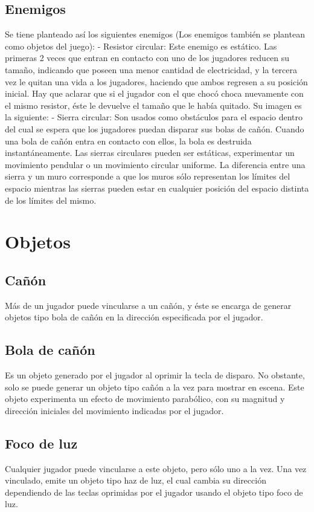 \documentclass{article}
\begin{document}
\subsection{Enemigos}
Se tiene planteado así los siguientes enemigos (Los enemigos también se plantean como objetos del juego):
    - Resistor circular: Este enemigo es estático. Las primeras 2 veces que entran en contacto con uno de los jugadores reducen su tamaño, indicando que poseen una menor cantidad de electricidad, y la tercera vez le quitan una vida a los jugadores, haciendo que ambos regresen a su posición inicial. Hay que aclarar que si el jugador con el que chocó choca nuevamente con el mismo resistor, éste le devuelve el tamaño que le había quitado. Su imagen es la siguiente:
    - Sierra circular: Son usados como obstáculos para el espacio dentro del cual se espera que los jugadores puedan disparar sus bolas de cañón. Cuando una bola de cañón entra en contacto con ellos, la bola es destruida instantáneamente. Las sierras circulares pueden ser estáticas, experimentar un movimiento pendular o un movimiento circular uniforme. La diferencia entre una sierra y un muro corresponde a que los muros sólo representan los límites del espacio mientras las sierras pueden estar en cualquier posición del espacio distinta de los límites del mismo.
\section{Objetos}
\subsection{Cañón}
Más de un jugador puede vincularse a un cañón, y éste se encarga de generar objetos tipo bola de cañón en la dirección especificada por el jugador.
\subsection{Bola de cañón}
Es un objeto generado por el jugador al oprimir la tecla de disparo. No obstante, solo se puede generar un objeto tipo cañón a la vez para mostrar en escena. Este objeto experimenta un efecto de movimiento parabólico, con su magnitud y dirección iniciales del movimiento indicadas por el jugador.
\subsection{Foco de luz}
Cualquier jugador puede vincularse a este objeto, pero sólo uno a la vez. Una vez vinculado, emite un objeto tipo haz de luz, el cual cambia su dirección dependiendo de las teclas oprimidas por el jugador usando el objeto tipo foco de luz.
\end{document}
